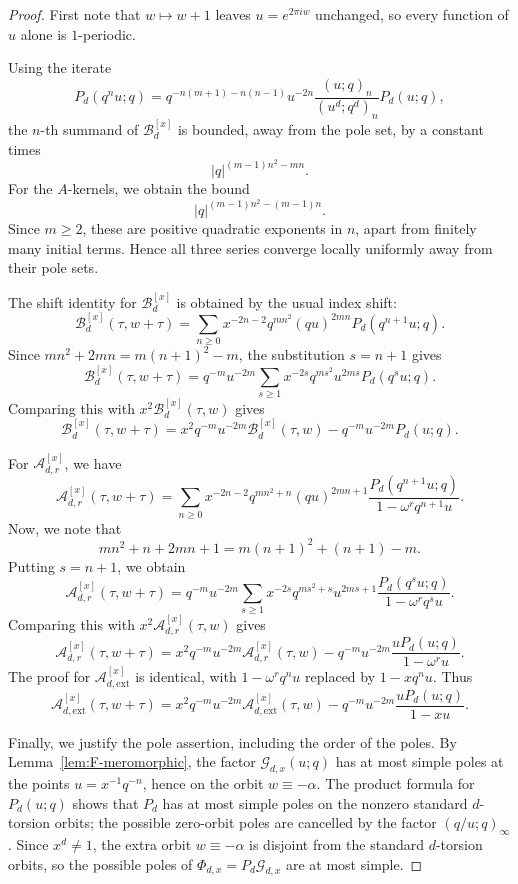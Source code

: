 \documentclass[12pt]{amsart}
\numberwithin{equation}{section}
\begin{document}
\begin{proof}
    First note that $w\mapsto w+1$ leaves $u=e^{2\pi i w}$ unchanged, so every function of $u$ alone is $1$-periodic.

Using the iterate
\[
P_d(q^n u;q)
=
q^{-n(m+1)-n(n-1)}u^{-2n}
\frac{(u;q)_n}{(u^d;q^d)_n}P_d(u;q),
\]
the \(n\)-th summand of \(\mathcal B_d^{[x]}\) is bounded, away from the pole set, by a constant times
\[
|q|^{(m-1)n^2-mn}.
\]
For the \(A\)-kernels, we obtain the bound
\[
|q|^{(m-1)n^2-(m-1)n}.
\]
Since \(m\geq 2\), these are positive quadratic exponents in \(n\), apart from finitely many initial terms. Hence all three series converge locally uniformly away from their pole sets. 



The shift identity for \(\mathcal B_d^{[x]}\) is obtained by the usual index shift:
\[
\mathcal B_d^{[x]}(\tau,w+\tau)
=
\sum_{n\geq 0}
x^{-2n-2}q^{mn^2}(qu)^{2mn}P_d(q^{n+1}u;q).
\]
Since \(mn^2+2mn=m(n+1)^2-m\), the substitution \(s=n+1\) gives
\[
\mathcal B_d^{[x]}(\tau,w+\tau)
=
q^{-m}u^{-2m}
\sum_{s\geq 1}
x^{-2s}q^{ms^2}u^{2ms}P_d(q^s u;q).
\]
Comparing this with \(x^2\mathcal B_d^{[x]}(\tau,w)\) gives
\[
\mathcal B_d^{[x]}(\tau,w+\tau)
=
x^2q^{-m}u^{-2m}\mathcal B_d^{[x]}(\tau,w)
-
q^{-m}u^{-2m}P_d(u;q).
\]

For \(\mathcal A_{d,r}^{[x]}\),  we have
\[
\mathcal A_{d,r}^{[x]}(\tau,w+\tau)
=
\sum_{n\geq 0}
x^{-2n-2}q^{mn^2+n}(qu)^{2mn+1}
\frac{P_d(q^{n+1}u;q)}{1-\omega^r q^{n+1}u}.
\]
Now, we note that
\[
mn^2+n+2mn+1=m(n+1)^2+(n+1)-m.
\]
Putting \(s=n+1\), we obtain
\[
\mathcal A_{d,r}^{[x]}(\tau,w+\tau)
=
q^{-m}u^{-2m}
\sum_{s\geq 1}
x^{-2s}q^{ms^2+s}u^{2ms+1}
\frac{P_d(q^s u;q)}{1-\omega^r q^s u}.
\]
Comparing this with \(x^2\mathcal A_{d,r}^{[x]}(\tau,w)\) gives
\[
\mathcal A_{d,r}^{[x]}(\tau,w+\tau)
=
x^2q^{-m}u^{-2m}\mathcal A_{d,r}^{[x]}(\tau,w)
-
q^{-m}u^{-2m}
\frac{uP_d(u;q)}{1-\omega^r u}.
\]
The proof for \(\mathcal A_{d,\mathrm{ext}}^{[x]}\) is identical, with \(1-\omega^r q^n u\) replaced by \(1-xq^n u\). Thus
\[
\mathcal A_{d,\mathrm{ext}}^{[x]}(\tau,w+\tau)
=
x^2q^{-m}u^{-2m}\mathcal A_{d,\mathrm{ext}}^{[x]}(\tau,w)
-
q^{-m}u^{-2m}
\frac{uP_d(u;q)}{1-xu}.
\]

Finally, we justify the pole assertion, including the order of the poles.  By Lemma~\ref{lem:F-meromorphic}, the factor \(\mathcal G_{d,x}(u;q)\) has at most simple poles at the points \(u=x^{-1}q^{-n}\), hence on the orbit \(w\equiv-\alpha\).  The product formula for \(P_d(u;q)\) shows that \(P_d\) has at most simple poles on the nonzero standard \(d\)-torsion orbits; the possible zero-orbit poles are cancelled by the factor \((q/u;q)_\infty\).  Since \(x^d\neq 1\), the extra orbit \(w\equiv-\alpha\) is disjoint from the standard \(d\)-torsion orbits, so the possible poles of \(\Phi_{d,x}=P_d\mathcal G_{d,x}\) are at most simple.


\end{proof}
\end{document}
